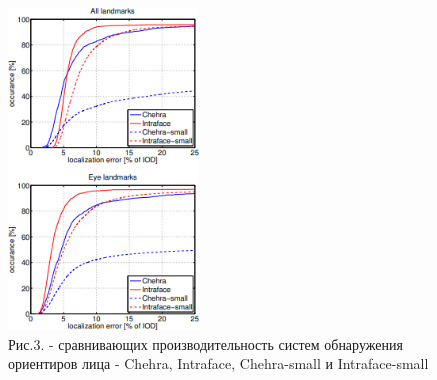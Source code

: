 \begin{figure}[H]
	\centering
	\includegraphics[width=0.45\textwidth]{media/ict/image17}
	\caption*{Рис.3. - сравнивающих производительность систем обнаружения ориентиров лица - Chehra, Intraface, Chehra-small и Intraface-small}
\end{figure}

